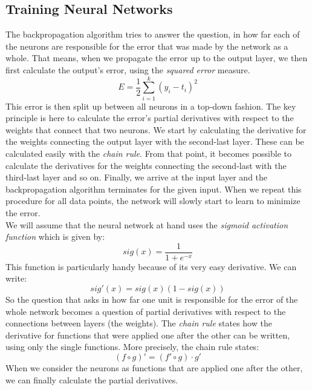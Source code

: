 \documentclass[11pt,a4paper]{article}
\begin{document}
\subsection{Training Neural Networks}
The backpropagation algorithm tries to answer the question, in how far each of the neurons are responsible for the error that was made by the network as a whole. That means, when we propagate the error up to the output layer, we then first calculate the output's error, using the \textit{squared error} measure.
\begin{equation*}
E = \frac{1}{2} \sum_{i=1}^k (y_i - t_i)^2
\end{equation*}
This error is then split up between all neurons in a top-down fashion. The key principle is here to calculate the error's partial derivatives with respect to the weights that connect that two neurons. We start by calculating the derivative for the weights connecting the output layer with the second-last layer. These can be calculated easily with the \textit{chain rule}. From that point, it becomes possible to calculate the derivatives for the weights connecting the second-last with the third-last layer and so on. Finally, we arrive at the input layer and the backpropagation algorithm terminates for the given input. When we repeat this procedure for all data points, the network will slowly start to learn to minimize the error.\\
We will assume that the neural network at hand uses the \textit{sigmoid activation function} which is given by:
\begin{equation*}
sig(x) = \frac{1}{1 + e^{-x}}
\end{equation*}
This function is particularly handy because of its very easy derivative. We can write:
\begin{equation*}
sig'(x) = sig(x) (1-sig(x))
\end{equation*}
So the question that asks in how far one unit is responsible for the error of the whole network becomes a question of partial derivatives with respect to the connections between layers (the weights). The \textit{chain rule} states how the derivative for functions that were applied one after the other can be written, using only the single functions. More precisely, the chain rule states:
\begin{equation} \label{eq:chainrule}
(f \circ g)' = (f' \circ g) \cdot g'
\end{equation}
When we consider the neurons as functions that are applied one after the other, we can finally calculate the partial derivatives.\\
\end{document}
